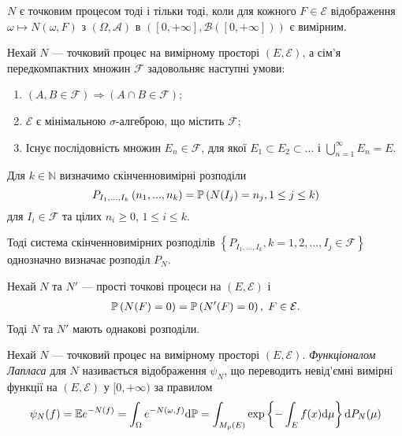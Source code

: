 \begin{theorem}
    $N$ є точковим процесом тоді і тільки тоді, коли для кожного
    $F \in \mathcal{E}$
    відображення $\omega \mapsto N(\omega, F)$
    з $\left(\Omega, \mathcal{A}\right)$
    в $\left([0, +\infty], \mathcal{B}([0, +\infty])\right)$
    є вимірним.
\end{theorem}
\begin{theorem}\label{th:point_proc_uniqueness}
    Нехай $N$ --- точковий процес на вимірному просторі
    $\left(E, \mathcal{E}\right)$, а сім'я передкомпактних множин $\mathcal{F}$
    задовольняє наступні умови:
    \begin{enumerate}
        \item $\left(A, B \in \mathcal{F}\right) \Rightarrow \left(A \cap B \in \mathcal{F}\right)$;
        \item $\mathcal{E}$ є мінімальною $\sigma$-алгеброю, що містить $\mathcal{F}$;
        \item Існує послідовність множин $E_n \in \mathcal{F}$, для якої
        $E_1 \subset E_2 \subset ...$ і $\bigcup_{n=1}^{\infty} E_n = E$.
    \end{enumerate}
    Для $k \in \mathbb{N}$ визначимо скінченновимірні розподіли
    $$
        P_{I_1,...,I_k} \left(n_1, ..., n_k\right) = 
        \P{N(I_j) = n_j, 1\leq j \leq k}
    $$
    для $I_i \in \mathcal{F}$ та цілих $n_i \geq 0$, $1 \leq i \leq k$.
    
    Тоді система скінченновимірних розподілів
    $\left\{P_{I_1,...,I_k}, k = 1,2,..., I_j \in \mathcal{F} \right\}$
    однозначно визначає розподіл $P_N$.
\end{theorem}

\begin{theorem}\label{th:point_proc_uniqueness_simple}
    Нехай $N$ та $N'$ --- прості точкові процеси на $\left(E, \mathcal{E}\right)$ і
    \begin{gather*}
        \P{N(F) = 0} = \P{N'(F) = 0}, \; F \in \mathcal{E}.
    \end{gather*}
    Тоді $N$ та $N'$ мають однакові розподіли.
\end{theorem}

\begin{definition}
    Нехай $N$ --- точковий процес на вимірному просторі
    $\left(E, \mathcal{E}\right)$. \emph{Функціоналом Лапласа} для $N$
    називається відображення $\psi_N$, що переводить невід'ємні
    вимірні функції на $\left(E, \mathcal{E}\right)$ у $[0, +\infty)$
    за правилом
    \begin{gather}
        \psi_N(f) = \E e^{-N(f)} = \int_{\Omega} e^{-N(\omega, f)} \d \mathbb{P} = 
        \int_{M_p(E)} \exp\left\{ -\int_E f(x) \d \mu\right\} \d P_N (\mu)
    \end{gather}
\end{definition}

